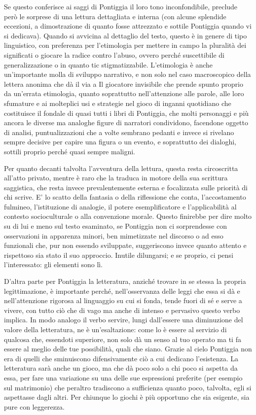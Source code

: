 Se questo conferisce ai saggi di Pontiggia il loro tono inconfondibile, preclude però le sorprese di una lettura dettagliata e interna (con alcune splendide eccezioni, a dimostrazione di quanto fosse attrezzato e sottile Pontiggia quando vi si dedicava). Quando si avvicina al dettaglio del testo, questo è in genere di tipo linguistico, con preferenza per l’etimologia per mettere in campo la pluralità dei significati o giocare la radice contro l’abuso, ovvero perché suscettibile di generalizzazione o in quanto tic stigmatizzabile. L’etimologia è anche un’importante molla di sviluppo narrativo, e non solo nel caso macroscopico della lettera anonima che dà il via a Il giocatore invisibile che prende spunto proprio da un’errata etimologia, quanto soprattutto nell’attenzione alle parole, alle loro sfumature e ai molteplici usi e strategie nel gioco di inganni quotidiano che costituisce il fondale di quasi tutti i libri di Pontiggia, che molti personaggi e più ancora le diverse ma analoghe figure di narratori condividono, facendone oggetto di analisi, puntualizzazioni che a volte sembrano pedanti e invece si rivelano sempre decisive per capire una figura o un evento, e soprattutto dei dialoghi, sottili proprio perché quasi sempre maligni.

Per quanto decanti talvolta l’avventura della lettura, questa resta circoscritta all’atto privato, mentre è raro che la traduca in motore della sua scrittura saggistica, che resta invece prevalentemente esterna e focalizzata sulle priorità di chi scrive. E’ lo scatto della fantasia o della riflessione che conta, l’accostamento fulmineo, l’istituzione di analogie, il potere esemplificatore e l’applicabilità al contesto socioculturale o alla convenzione morale. Questo finirebbe per dire molto su di lui e meno sul testo esaminato, se Pontiggia non ci sorprendesse con osservazioni in apparenza minori, ben mimetizzate nel discorso o ad esso funzionali che, pur non essendo sviluppate, suggeriscono invece quanto attento e rispettoso sia stato il suo approccio. Inutile dilungarsi; e se proprio, ci pensi l’interessato: gli elementi sono lì.

D’altra parte per Pontiggia la letteratura, anziché trovare in se stessa la propria legittimazione, è importante perché, nell’osservanza delle leggi che essa si dà e nell’attenzione rigorosa al linguaggio su cui si fonda, tende fuori di sé e serve a vivere, con tutto ciò che di vago ma anche di intenso e pervasivo questo verbo implica. In modo analogo il verbo servire, lungi dall’essere una diminuzione del valore della letteratura, ne è un’esaltazione: come lo è essere al servizio di qualcosa che, essendoti superiore, non solo dà un senso al tuo operato ma ti fa essere al meglio delle tue possibilità, quali che siano. Grazie al cielo Pontiggia non era di quelli che sminuiscono difensivamente ciò a cui dedicano l’esistenza. La letteratura sarà anche un gioco, ma che dà poco solo a chi poco si aspetta da essa, per fare una variazione su una delle sue espressioni preferite (per esempio sul matrimonio) che peraltro tradiscono a sufficienza quanto poco, talvolta, egli si aspettasse dagli altri. Per chiunque lo giochi è più opportuno che sia esigente, sia pure con leggerezza.



